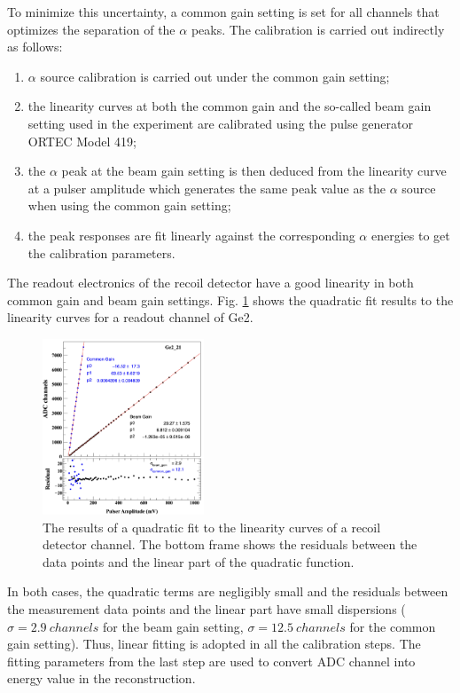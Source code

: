 \documentclass[number,5p]{elsarticle}
\begin{document}
To minimize this uncertainty, a common gain setting is set for all channels that optimizes the separation of the \(\alpha\) peaks.
The calibration is carried out indirectly as follows:
\begin{enumerate}
\item \(\alpha\) source calibration is carried out under the common gain setting;
\item the linearity curves at both the common gain and the so-called beam gain
  setting used in the experiment are calibrated using the pulse generator ORTEC Model 419;
\item the $\alpha$ peak at the beam gain setting is then deduced
  from the linearity curve at a pulser amplitude which generates the same peak
  value as the $\alpha$ source when using the common gain setting;
\item the peak responses are fit linearly against the corresponding $\alpha$ energies
  to get the calibration parameters.
\end{enumerate}
The readout electronics of the recoil detector have a good linearity in both common gain and beam gain settings.
Fig. \ref{fig:electronic_linearity} shows the quadratic fit results to the linearity curves for a readout channel of Ge2.
\begin{figure}[h!]
  \centering
  \includegraphics[width=0.43\textwidth]{./linearity_quadratic_residual.png}
  \caption{The results of a quadratic fit to the linearity curves of a recoil
    detector channel. The bottom frame shows the residuals between the data
    points and the linear part of the quadratic function.}
  \label{fig:electronic_linearity}
\end{figure}
In both cases, the quadratic terms are negligibly small and the residuals
between the measurement data points and the linear part have small dispersions
($\sigma=\SI{2.9}{channels}$ for the beam gain setting, $\sigma=\SI{12.5}{channels}$ for the common gain setting).
Thus, linear fitting is adopted in all the calibration steps.
The fitting parameters from the last step are used to convert ADC channel into
energy value in the reconstruction.
\end{document}
